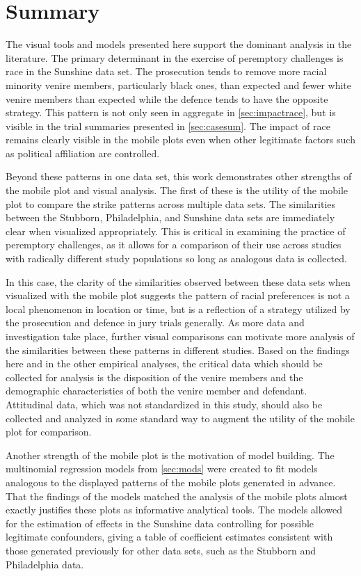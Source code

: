 \chapter{Summary}
\label{c:summary}

The visual tools and models presented here support the dominant analysis in the literature. The primary determinant in the
exercise of peremptory challenges is race in the Sunshine data set. The prosecution tends to remove more racial minority venire
members, particularly black ones, than expected and fewer white venire members than expected while the defence tends to have the
opposite strategy. This pattern is not only seen in aggregate in \ref{sec:impactrace}, but is visible in the trial summaries
presented in \ref{sec:casesum}. The impact of race remains clearly visible in the mobile plots even when other legitimate factors
such as political affiliation are controlled.

Beyond these patterns in one data set, this work demonstrates other strengths of the mobile plot and visual
analysis. The first of these is the utility of the mobile plot to compare the strike patterns across multiple data sets. The
similarities between the Stubborn, Philadelphia, and Sunshine data sets are immediately clear when visualized appropriately. This
is critical in examining the practice of peremptory challenges, as it allows for a comparison of their use across studies with
radically different study populations so long as analogous data is collected.

In this case, the clarity of the similarities observed between these data sets when visualized with the mobile plot suggests the
pattern of racial preferences is not a local phenomenon in location or time, but is a reflection of a strategy utilized by the
prosecution and defence in jury trials generally. As more data and investigation take place, further visual comparisons can
motivate more analysis of the similarities between these patterns in different studies. Based on the findings here and in the
other empirical analyses, the critical data which should be collected for analysis is the disposition of the venire members and
the demographic characteristics of both the venire member and defendant. Attitudinal data, which was not standardized in this
study, should also be collected and analyzed in some standard way to augment the utility of the mobile plot for comparison.

Another strength of the mobile plot is the motivation of model building. The multinomial regression models from \ref{sec:mods}
were created to fit models analogous to the displayed patterns of the mobile plots generated in advance. That the findings of the
models matched the analysis of the mobile plots almost exactly justifies these plots as informative analytical tools. The models
allowed for the estimation of effects in the Sunshine data controlling for possible legitimate confounders, giving a table of
coefficient estimates consistent with those generated previously for other data sets, such as the Stubborn and Philadelphia data.

